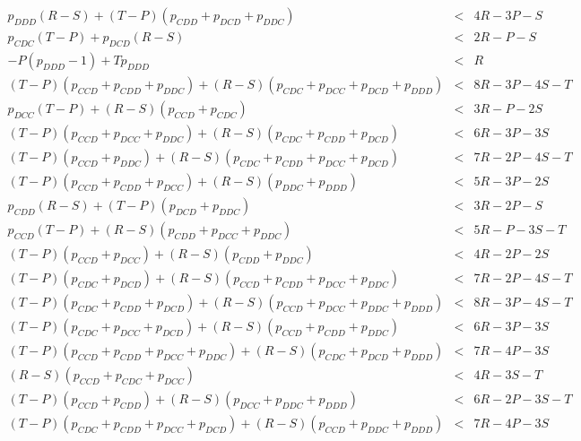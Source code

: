 \documentclass{article}
\theoremstyle{definition}
\begin{document}
\begin{equation*}
  \begin{array}{ccc}
    p_{DDD} \left(R - S\right) + \left(T - P\right) \left(p_{CDD} + p_{DCD} + p_{DDC}\right) & < & 4 R - 3 P  - S \\
    p_{CDC} \left(T - P\right) + p_{DCD} \left(R - S\right) & < & 2 R - P  - S \\
    - P \left(p_{DDD} - 1\right) + T p_{DDD} & < & R \\ 
    \left(T - P\right) \left(p_{CCD} + p_{CDD} + p_{DDC}\right) + \left(R - S\right) \left(p_{CDC} + p_{DCC} + p_{DCD} + p_{DDD}\right) & < & 8 R - 3 P - 4 S - T \\
    p_{DCC} \left(T - P\right) + \left(R - S\right) \left(p_{CCD} + p_{CDC}\right) & < & 3 R - P - 2 S \\
    \left(T - P\right) \left(p_{CCD} + p_{DCC} + p_{DDC}\right) + \left(R - S\right) \left(p_{CDC} + p_{CDD} + p_{DCD}\right) & < & 6 R - 3 P - 3 S \\
    \left(T - P\right) \left(p_{CCD} + p_{DDC}\right) + \left(R - S\right) \left(p_{CDC} + p_{CDD} + p_{DCC} + p_{DCD}\right) & < & 7 R - 2 P - 4 S - T \\
    \left(T - P\right) \left(p_{CCD} + p_{CDD} + p_{DCC}\right) + \left(R - S\right) \left(p_{DDC} + p_{DDD}\right) & < & 5 R - 3 P - 2 S \\
    p_{CDD} \left(R - S\right) + \left(T - P\right) \left(p_{DCD} + p_{DDC}\right) & < & 3 R - 2 P - S \\ 
    p_{CCD} \left(T - P\right) + \left(R - S\right) \left(p_{CDD} + p_{DCC} + p_{DDC}\right) & < & 5 R - P - 3 S - T \\
    \left(T - P\right) \left(p_{CCD} + p_{DCC}\right) + \left(R - S\right) \left(p_{CDD} + p_{DDC}\right) & < & 4 R - 2 P - 2 S \\
    \left(T - P\right) \left(p_{CDC} + p_{DCD}\right) + \left(R - S\right) \left(p_{CCD} + p_{CDD} + p_{DCC} + p_{DDC}\right) & < & 7 R - 2 P - 4 S - T \\
    \left(T - P\right) \left(p_{CDC} + p_{CDD} + p_{DCD}\right) + \left(R - S\right) \left(p_{CCD} + p_{DCC} + p_{DDC} + p_{DDD}\right) & < & 8 R - 3 P - 4 S - T \\
    \left(T - P\right) \left(p_{CDC} + p_{DCC} + p_{DCD}\right) + \left(R - S\right) \left(p_{CCD} + p_{CDD} + p_{DDC}\right) & < & 6 R - 3 P - 3 S \\
    \left(T - P\right) \left(p_{CCD} + p_{CDD} + p_{DCC} + p_{DDC}\right) + \left(R - S\right) \left(p_{CDC} + p_{DCD} + p_{DDD}\right) & < & 7 R - 4 P - 3 S \\
    \left(R - S\right) \left(p_{CCD} + p_{CDC} + p_{DCC}\right) & < & 4 R - 3 S - T \\
    \left(T - P\right) \left(p_{CCD} + p_{CDD}\right) + \left(R - S\right) \left(p_{DCC} + p_{DDC} + p_{DDD}\right) & < & 6 R - 2 P - 3 S - T \\
    \left(T - P\right) \left(p_{CDC} + p_{CDD} + p_{DCC} + p_{DCD}\right) + \left(R - S\right) \left(p_{CCD} + p_{DDC} + p_{DDD}\right) & < & 7 R - 4 P - 3 S \\
    \end{array}
\end{equation*}

~\\

\end{document}
